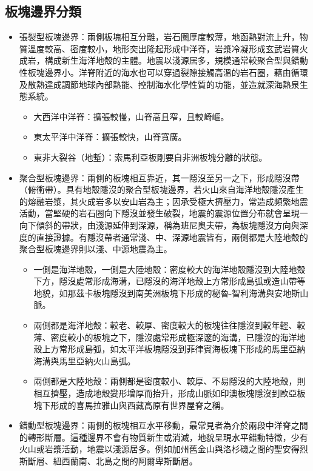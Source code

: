 \documentclass[a4paper,12pt]{report}
\begin{document}
\subsection{板塊邊界分類}
\begin{itemize}
\item 張裂型板塊邊界：兩側板塊相互分離，岩石圈厚度較薄，地函熱對流上升，物質溫度較高、密度較小，地形突出隆起形成中洋脊，岩漿冷凝形成玄武岩質火成岩，構成新生海洋地殼的主體。地震以淺源居多，規模通常較聚合型與錯動性板塊邊界小。洋脊附近的海水也可以穿過裂隙接觸高溫的岩石圈，藉由循環及散熱達成調節地球內部熱能、控制海水化學性質的功能，並造就深海熱泉生態系統。
\begin{itemize}
\item 大西洋中洋脊：擴張較慢，山脊高且窄，且較崎嶇。
\item 東太平洋中洋脊：擴張較快，山脊寬廣。
\item 東非大裂谷（地塹）：索馬利亞板剛要自非洲板塊分離的狀態。
\end{itemize}
\item 聚合型板塊邊界：兩側的板塊相互靠近，其一隱沒至另一之下，形成隱沒帶（俯衝帶）。具有地殼隱沒的聚合型板塊邊界，若火山來自海洋地殼隱沒產生的熔融岩漿，其火成岩多以安山岩為主；因承受極大擠壓力，常造成頻繁地震活動，當堅硬的岩石圈向下隱沒並發生破裂，地震的震源位置分布就會呈現一向下傾斜的帶狀，由淺源延伸到深源，稱為班尼奧夫帶，為板塊隱沒方向與深度的直接證據。有隱沒帶者通常淺、中、深源地震皆有，兩側都是大陸地殼的聚合型板塊邊界則以淺、中源地震為主。
\begin{itemize}
\item 一側是海洋地殼，一側是大陸地殼：密度較大的海洋地殼隱沒到大陸地殼下方，隱沒處常形成海溝，已隱沒的海洋地殼上方常形成島弧或造山帶等地貌，如那茲卡板塊隱沒到南美洲板塊下形成的秘魯-智利海溝與安地斯山脈。
\item 兩側都是海洋地殼：較老、較厚、密度較大的板塊往往隱沒到較年輕、較薄、密度較小的板塊之下，隱沒處常形成極深邃的海溝，已隱沒的海洋地殼上方常形成島弧，如太平洋板塊隱沒到菲律賓海板塊下形成的馬里亞納海溝與馬里亞納火山島弧。
\item 兩側都是大陸地殼：兩側都是密度較小、較厚、不易隱沒的大陸地殼，則相互擠壓，造成地殼變形增厚而抬升，形成山脈如印澳板塊隱沒到歐亞板塊下形成的喜馬拉雅山與西藏高原有世界屋脊之稱。
\end{itemize}
\item 錯動型板塊邊界：兩側的板塊相互水平移動，最常見者為介於兩段中洋脊之間的轉形斷層。這種邊界不會有物質新生或消滅，地貌呈現水平錯動特徵，少有火山或岩漿活動，地震以淺源居多。例如加州舊金山與洛杉磯之間的聖安得烈斯斷層、紐西蘭南、北島之間的阿爾卑斯斷層。
\end{itemize}
\end{document}
